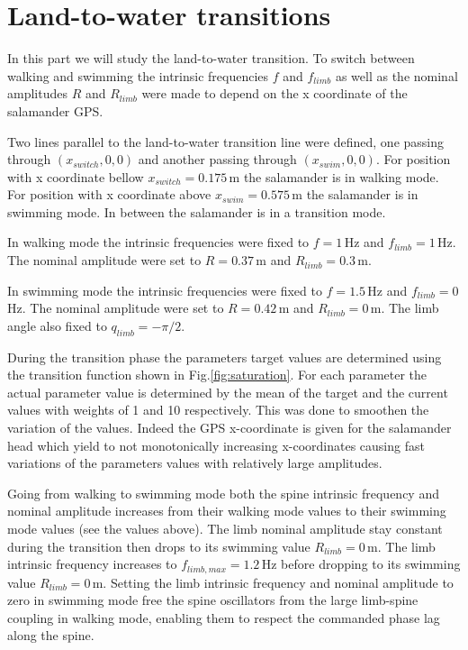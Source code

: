 \documentclass[a4paper]{scrartcl}
\begin{document}
{\section{Land-to-water transitions}
In this part we will study the land-to-water transition. To switch between walking and swimming the intrinsic frequencies $f$ and $f_{limb}$ as well as the nominal amplitudes $R$ and $R_{limb}$ were made to depend on the x coordinate of the salamander GPS.

Two lines parallel to the land-to-water transition line were defined, one passing through $(x_{switch},0,0)$ and another passing through $(x_{swim},0,0)$. For position with x coordinate bellow $x_{switch}=0.175$\,m the salamander is in walking mode. For position with x coordinate above $x_{swim}=0.575$\,m the salamander is in swimming mode. In between the salamander is in a transition mode.

In walking mode the intrinsic frequencies were fixed to $f=1$\,Hz and $f_{limb}=1$\,Hz. The nominal amplitude were set to $R=0.37$\,m and $R_{limb}=0.3$\,m.

In swimming mode the intrinsic frequencies were fixed to $f=1.5$\,Hz and $f_{limb}=0$\,Hz. The nominal amplitude were set to $R=0.42$\,m and $R_{limb}=0$\,m. The limb angle also fixed to $q_{limb}=-\pi/2$. 

During the transition phase the parameters target values are determined using the transition function shown in Fig.\ref{fig:saturation}. For each parameter the actual parameter value is determined by the mean of the target and the current values with weights of 1 and 10 respectively. This was done to smoothen the variation of the values. Indeed the GPS x-coordinate is given for the salamander head which yield to not monotonically increasing x-coordinates causing fast variations of the parameters values with relatively large amplitudes.

Going from walking to swimming mode both the spine intrinsic frequency and nominal amplitude increases from their walking mode values to their swimming mode values (see the values above). The limb nominal amplitude stay constant during the transition then drops to its swimming value $R_{limb}=0$\,m. The limb intrinsic frequency increases to $f_{limb,max}=1.2$\,Hz before dropping to its swimming value $R_{limb}=0$\,m. Setting the limb intrinsic frequency and nominal amplitude to zero in swimming mode free the spine oscillators from the large limb-spine coupling in walking mode, enabling them to respect the commanded phase lag along the spine.

}
\end{document}
